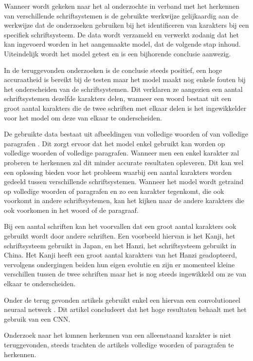 Wanneer wordt gekeken naar het al onderzochte in verband met het herkennen van verschillende schriftsystemen is de gebruikte werkwijze gelijkaardig aan de werkwijze dat de onderzoeken gebruiken bij het identificeren van karakters bij een specifiek schriftsysteem.
De data wordt verzameld en verwerkt zodanig dat het kan ingevoerd worden in het aangemaakte model, dat de volgende stap inhoud.
Uiteindelijk wordt het model getest en is een bijhorende conclusie aanwezig.

In de teruggevonden onderzoeken is de conclusie steeds positief, een hoge accuraatheid is bereikt bij de testen maar het model maakt nog enkele fouten bij het onderscheiden van de schriftsystemen. Dit verklaren ze aangezien een aantal schriftsystemen dezelfde karakters delen, wanneer een woord bestaat uit een groot aantal karakters die de twee schriften met elkaar delen is het ingewikkelder voor het model om deze van elkaar te onderscheiden. \autocite{Adman2015}

De gebruikte data bestaat uit afbeeldingen van volledige woorden \autocite{Baoguang2015} of van volledige paragrafen \autocite{Guo2009}.
Dit zorgt ervoor dat het model enkel gebruikt kan worden op volledige woorden of volledige paragrafen. Wanneer men een enkel karakter zal proberen te herkennen zal dit minder accurate resultaten opleveren.
Dit kan wel een oplossing bieden voor het probleem waarbij een aantal karakters worden gedeeld tussen verschillende schriftsystemen.
Wanneer het model wordt getraind op volledige woorden of paragrafen en zo een karakter tegenkomt, die ook voorkomt in andere schriftsystemen, kan het kijken naar de andere karakters die ook voorkomen in het woord of de paragraaf.

Bij een aantal schriften kan het voorvallen dat een groot aantal karakters ook gebruikt wordt door andere schriften.
Een voorbeeld hiervan is het Kanji, het schriftsysteem gebruikt in Japan, en het Hanzi, het schriftsysteem gebruikt in China.
Het Kanji heeft een groot aantal karakters van het Hanzi geadopteerd, vervolgens ondergingen beiden hun eigen evolutie en zijn er momenteel kleine verschillen tussen de twee schriften maar het is nog steeds ingewikkeld om ze van elkaar te onderscheiden. \autocite{Koichi2010}

Onder de terug gevonden artikels gebruikt enkel een hiervan een convolutioneel neuraal netwerk \textcite{Baoguang2015}.
Dit artikel concludeert dat het hoge resultaten behaalt met het gebruik van een CNN.

Onderzoek naar het kunnen herkennen van een alleenstaand karakter is niet teruggevonden, steeds trachten de artikels volledige woorden of paragrafen te herkennen.


















